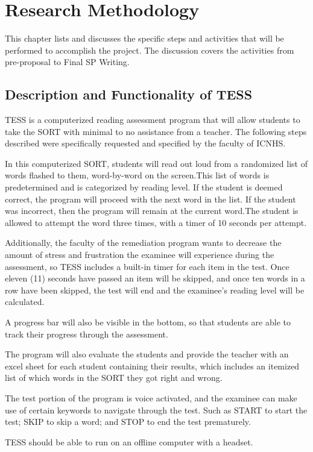 \chapter{Research Methodology}
This chapter lists and discusses the specific steps and activities that will be performed  to accomplish the project. 
The discussion covers the activities from pre-proposal to Final SP Writing.

\section{Description and Functionality of TESS}
TESS is a computerized reading assessment program that will allow students to take the SORT with minimal to no assistance from a teacher. The following steps described were specifically requested and specified by the faculty of ICNHS.

In this computerized SORT, students will read out loud from a randomized list of words flashed to them, word-by-word on the screen.This list of words is predetermined and is categorized by reading level. If the student is deemed correct, the program will proceed with the next word in the list. If the student was incorrect, then the program will remain at the current word.The student is allowed to attempt the word three times, with a timer of 10 seconds per attempt.

Additionally, the faculty of the remediation program wants to decrease the amount of stress and frustration the examinee will experience during the assessment, so TESS includes a built-in timer for each item in the test. Once eleven (11) seconds have passed an item will be skipped, and once ten words in a row have been skipped, the test will end and the examinee’s reading level will be calculated.

A progress bar will also be visible in the bottom, so that students are able to track their progress through the assessment.

The program will also evaluate the students and provide the teacher with an excel sheet for each student containing their results, which includes an itemized list of which words in the SORT they got right and wrong.

The test portion of the program is voice activated, and the examinee can make use of certain keywords to navigate through the test. Such as START to start the test; SKIP to skip a word; and STOP to end the test prematurely.

TESS should be able to run on an offline computer with a headset.

